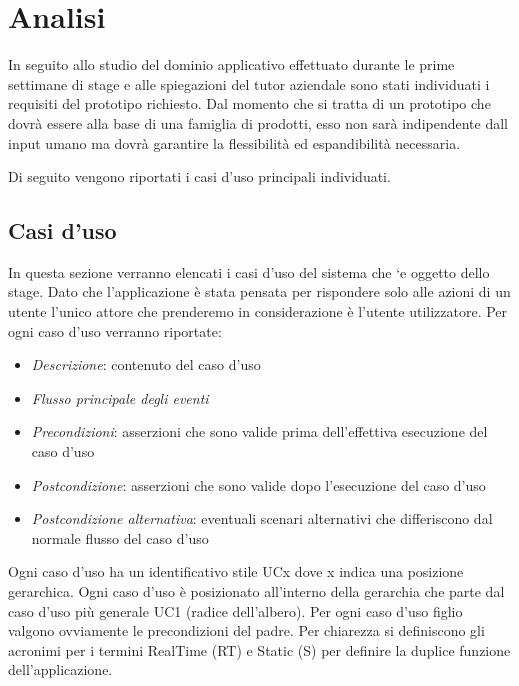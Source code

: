 
\section{Analisi}

In seguito allo studio del dominio applicativo effettuato durante le prime settimane di stage e alle spiegazioni del tutor aziendale sono stati individuati i requisiti del prototipo richiesto.
Dal momento che si tratta di un prototipo che dovrà essere alla base di una famiglia di prodotti, esso non sarà indipendente dall input umano ma dovrà garantire la flessibilità ed espandibilità necessaria.

Di seguito vengono riportati i casi d'uso principali individuati.

\subsection{Casi d'uso}

In questa sezione verranno elencati i casi d'uso del sistema che `e oggetto dello stage.
Dato che l'applicazione è stata pensata per rispondere solo alle azioni di un utente l'unico attore che prenderemo in
considerazione è l'utente utilizzatore. Per ogni caso d'uso verranno riportate:

\begin{itemize}
\item  \textit{Descrizione}: contenuto del caso d'uso
\item  \textit{Flusso principale degli eventi}
\item  \textit{Precondizioni}: asserzioni che sono valide prima dell'effettiva esecuzione del
caso d'uso
\item  \textit{Postcondizione}: asserzioni che sono valide dopo l'esecuzione del caso d'uso
\item  \textit{Postcondizione alternativa}: eventuali scenari alternativi che differiscono dal normale flusso del caso d'uso
\end{itemize}
Ogni caso d'uso ha un identificativo stile UCx dove x indica una posizione gerarchica.
Ogni caso d'uso è posizionato all'interno della gerarchia che parte dal caso d'uso più generale UC1 (radice dell'albero). Per ogni caso d'uso figlio valgono ovviamente le precondizioni del padre. Per chiarezza si definiscono gli acronimi per i termini RealTime (RT) e Static (S) per definire la duplice funzione dell'applicazione.

